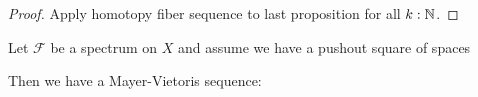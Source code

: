 \begin{proof}
  Apply homotopy fiber sequence to last proposition for all $k:\mathbb{N}$.
\end{proof}

\begin{lemma}
  \label{mayer-vietoris-sequence}
  Let $\mathcal F$ be a spectrum on $X$ and assume we have a pushout square of spaces
  \begin{center}
  \end{center}
  Then we have a Mayer-Vietoris sequence:
  \begin{center}
  \end{center}
\end{lemma}
 
